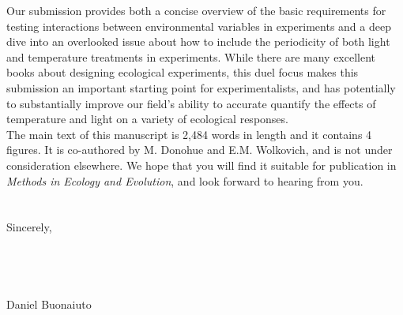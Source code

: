 \documentclass[11.5 pt]{article}
\begin{document}
\noindent Our submission provides both a concise overview of the basic requirements for testing interactions between environmental variables in experiments and a deep dive into an overlooked issue about how to include the periodicity of both light and temperature treatments in experiments. While there are many excellent books about designing ecological experiments, this duel focus makes this submission an important starting point for experimentalists, and has potentially to substantially improve our field's ability to accurate quantify the effects of temperature and light on a variety of ecological responses. \\

\noindent The main text of this manuscript is 2,484 words in length and it contains 4 figures. It is co-authored by M. Donohue and E.M. Wolkovich, and is not under consideration elsewhere. We hope that you will find it suitable for publication in \textit{Methods in Ecology and Evolution}, and look forward to hearing from you.\\\\ 
\\Sincerely,\\\\\\\\\\

\noindent Daniel Buonaiuto\\


\end{document}
